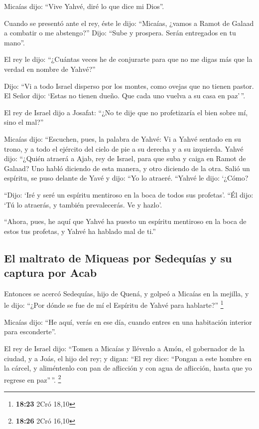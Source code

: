 \begin{paracol}{2}
 Micaías dijo: ``Vive Yahvé, diré lo que dice mi Dios''.

 Cuando se presentó ante el rey, éste le dijo: ``Micaías,
¿vamos a Ramot de Galaad a combatir o me abstengo?'' Dijo: ``Sube y
prospera. Serán entregados en tu mano''.

 El rey le dijo: ``¿Cuántas veces he de conjurarte para
que no me digas más que la verdad en nombre de Yahvé?''

 Dijo: ``Vi a todo Israel disperso por los montes, como
ovejas que no tienen pastor. El Señor dijo: `Estas no tienen dueño. Que
cada uno vuelva a su casa en paz'\,''.

 El rey de Israel dijo a Josafat: ``¿No te dije que no
profetizaría el bien sobre mí, sino el mal?''

 Micaías dijo: ``Escuchen, pues, la palabra de Yahvé: Vi
a Yahvé sentado en su trono, y a todo el ejército del cielo de pie a su
derecha y a su izquierda.  Yahvé dijo: ``¿Quién atraerá a
Ajab, rey de Israel, para que suba y caiga en Ramot de Galaad? Uno habló
diciendo de esta manera, y otro diciendo de la otra. 
Salió un espíritu, se puso delante de Yavé y dijo: ``Yo lo atraeré.
``Yahvé le dijo: `¿Cómo?

 ``Dijo: `Iré y seré un espíritu mentiroso en la boca de
todos sus profetas'. ``Él dijo: `Tú lo atraerás, y también prevalecerás.
Ve y hazlo'.

 ``Ahora, pues, he aquí que Yahvé ha puesto un espíritu
mentiroso en la boca de estos tus profetas, y Yahvé ha hablado mal de
ti.''

\hypertarget{el-maltrato-de-miqueas-por-sedequuxedas-y-su-captura-por-acab}{%
\subsection{El maltrato de Miqueas por Sedequías y su captura por
Acab}\label{el-maltrato-de-miqueas-por-sedequuxedas-y-su-captura-por-acab}}

 Entonces se acercó Sedequías, hijo de Quená, y golpeó a
Micaías en la mejilla, y le dijo: ``¿Por dónde se fue de mí el Espíritu
de Yahvé para hablarte?'' \footnote{\textbf{18:23} 2Cró 18,10}

 Micaías dijo: ``He aquí, verás en ese día, cuando entres
en una habitación interior para esconderte''.

 El rey de Israel dijo: ``Tomen a Micaías y llévenlo a
Amón, el gobernador de la ciudad, y a Joás, el hijo del rey;
 y digan: ``El rey dice: ``Pongan a este hombre en la
cárcel, y aliméntenlo con pan de aflicción y con agua de aflicción,
hasta que yo regrese en paz''\,''. \footnote{\textbf{18:26} 2Cró 16,10}


\end{paracol}
